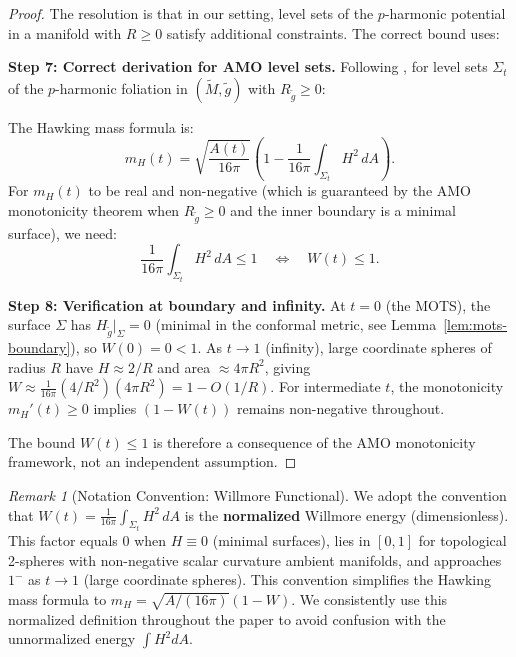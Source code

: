 \documentclass[12pt]{article}
\theoremstyle{plain}
\theoremstyle{definition}
\theoremstyle{remark}
\newtheorem{remark}[theorem]{Remark}
\newcommand{\tM}{\tilde{M}}
\newcommand{\tg}{\tilde{g}}
\begin{document}
\begin{proof}
The resolution is that in our setting, level sets of the $p$-harmonic potential in a manifold with $R \geq 0$ satisfy additional constraints. The correct bound uses:

\textbf{Step 7: Correct derivation for AMO level sets.}
Following \cite[Lemma~3.5]{amo2022}, for level sets $\Sigma_t$ of the $p$-harmonic foliation in $(\tM, \tg)$ with $R_{\tg} \geq 0$:

The Hawking mass formula is:
\[
m_H(t) = \sqrt{\frac{A(t)}{16\pi}}\left(1 - \frac{1}{16\pi}\int_{\Sigma_t} H^2 \, dA\right).
\]
For $m_H(t)$ to be real and non-negative (which is guaranteed by the AMO monotonicity theorem \cite[Theorem~4.1]{amo2022} when $R_{\tg} \geq 0$ and the inner boundary is a minimal surface), we need:
\[
\frac{1}{16\pi}\int_{\Sigma_t} H^2 \, dA \leq 1 \quad \Longleftrightarrow \quad W(t) \leq 1.
\]

\textbf{Step 8: Verification at boundary and infinity.}
At $t = 0$ (the MOTS), the surface $\Sigma$ has $H_{\tg}|_\Sigma = 0$ (minimal in the conformal metric, see Lemma~\ref{lem:mots-boundary}), so $W(0) = 0 < 1$. As $t \to 1$ (infinity), large coordinate spheres of radius $R$ have $H \approx 2/R$ and area $\approx 4\pi R^2$, giving $W \approx \frac{1}{16\pi}(4/R^2)(4\pi R^2) = 1 - O(1/R)$. For intermediate $t$, the monotonicity $m_H'(t) \geq 0$ implies $(1 - W(t))$ remains non-negative throughout.

The bound $W(t) \leq 1$ is therefore a consequence of the AMO monotonicity framework, not an independent assumption.
\end{proof}

\begin{remark}[Notation Convention: Willmore Functional]\label{rem:willmore-notation}
We adopt the convention that $W(t) = \frac{1}{16\pi}\int_{\Sigma_t} H^2 \, dA$ is the \textbf{normalized} Willmore energy (dimensionless). This factor equals 0 when $H \equiv 0$ (minimal surfaces), lies in $[0, 1]$ for topological 2-spheres with non-negative scalar curvature ambient manifolds, and approaches $1^-$ as $t \to 1$ (large coordinate spheres). This convention simplifies the Hawking mass formula to $m_H = \sqrt{A/(16\pi)}(1 - W)$. We consistently use this normalized definition throughout the paper to avoid confusion with the unnormalized energy $\int H^2 dA$.
\end{remark}
\end{document}
